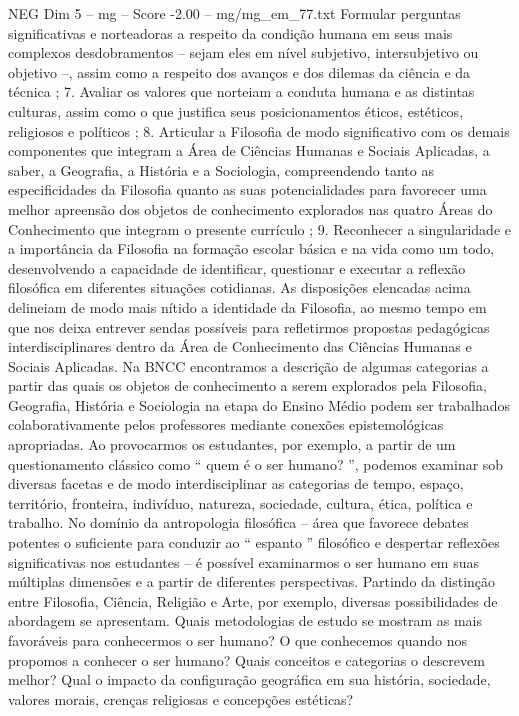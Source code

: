 \begin{textsample}{NEG Dim 5 – mg – Score -2.00 – mg/mg\_em\_77.txt}
Formular perguntas significativas e norteadoras a respeito da condição humana em seus mais complexos desdobramentos – sejam eles em nível subjetivo, intersubjetivo ou objetivo –, assim como a respeito dos avanços e dos dilemas da ciência e da técnica ; 7.
Avaliar os valores que norteiam a conduta humana e as distintas culturas, assim como o que justifica seus posicionamentos éticos, estéticos, religiosos e políticos ; 8.
Articular a Filosofia de modo significativo com os demais componentes que integram a Área de Ciências Humanas e Sociais Aplicadas, a saber, a Geografia, a História e a Sociologia, compreendendo tanto as especificidades da Filosofia quanto as suas potencialidades para favorecer uma melhor apreensão dos objetos de conhecimento explorados nas quatro Áreas do Conhecimento que integram o presente currículo ; 9.
Reconhecer a singularidade e a importância da Filosofia na formação escolar básica e na vida como um todo, desenvolvendo a capacidade de identificar, questionar e executar a reflexão filosófica em diferentes situações cotidianas.
As disposições elencadas acima delineiam de modo mais nítido a identidade da Filosofia, ao mesmo tempo em que nos deixa entrever sendas possíveis para refletirmos propostas pedagógicas interdisciplinares dentro da Área de Conhecimento das Ciências Humanas e Sociais Aplicadas.
Na BNCC encontramos a descrição de algumas categorias a partir das quais os objetos de conhecimento a serem explorados pela Filosofia, Geografia, História e Sociologia na etapa do Ensino Médio podem ser trabalhados colaborativamente pelos professores mediante conexões epistemológicas apropriadas.
Ao provocarmos os estudantes, por exemplo, a partir de um questionamento clássico como “ quem é o ser humano? ”, podemos examinar sob diversas facetas e de modo interdisciplinar as categorias de tempo, espaço, território, fronteira, indivíduo, natureza, sociedade, cultura, ética, política e trabalho.
No domínio da antropologia filosófica – área que favorece debates potentes o suficiente para conduzir ao “ espanto ” filosófico e despertar reflexões significativas nos estudantes – é possível examinarmos o ser humano em suas múltiplas dimensões e a partir de diferentes perspectivas.
Partindo da distinção entre Filosofia, Ciência, Religião e Arte, por exemplo, diversas possibilidades de abordagem se apresentam.
Quais metodologias de estudo se mostram as mais favoráveis para conhecermos o ser humano?
O que conhecemos quando nos propomos a conhecer o ser humano?
Quais conceitos e categorias o descrevem melhor?
Qual o impacto da configuração geográfica em sua história, sociedade, valores morais, crenças religiosas e concepções estéticas?

\end{textsample}
